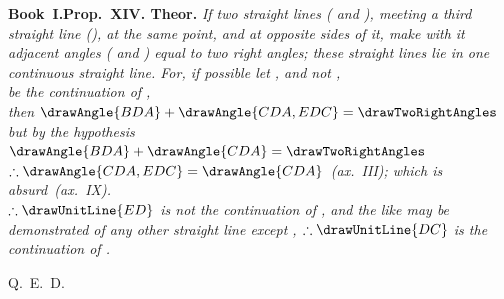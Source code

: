 \documentclass[12pt]{article}\usepackage{geometry}\geometry{a5paper,margin=1.5cm}
\begin{document}
\noindent\begin{minipage}[t]{0.45\linewidth}\centering\vspace{0pt}%
\drawCurrentPicture\end{minipage}\hfill
\begin{minipage}[t]{0.52\linewidth}\vspace{0pt}%
\textbf{Book~I.\enspace Prop.\ XIV. Theor.}
\medskip\noindent\itshape
If two straight lines ( and ),
meeting a third straight line (), at the same point,
and at opposite sides of it, make with it adjacent angles
( and ) equal to two right angles;
these straight lines lie in one continuous straight line.
\bigskip\noindent\upshape
For, if possible let , and not ,\\
be the continuation of ,\\
then $\drawAngle{BDA}+\drawAngle{CDA,EDC}=\drawTwoRightAngles$\\[4pt]
but by the hypothesis $\drawAngle{BDA}+\drawAngle{CDA}=\drawTwoRightAngles$\\[4pt]
$\therefore\drawAngle{CDA,EDC}=\drawAngle{CDA}$~(ax.~III); which is absurd~(ax.~IX).\\[4pt]
$\therefore \drawUnitLine{ED}$ is not the continuation of ,
and the like may be demonstrated of any other straight line except
, $\therefore \drawUnitLine{DC}$ is the continuation of
.
\begin{flushright}Q.\ E.\ D.\end{flushright}
\end{minipage}
\end{document}
